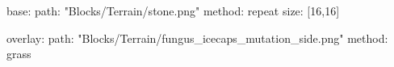 base:
  path: "Blocks/Terrain/stone.png"
  method: repeat
  size: [16,16]

overlay:
  path: "Blocks/Terrain/fungus_icecaps_mutation_side.png"
  method: grass
